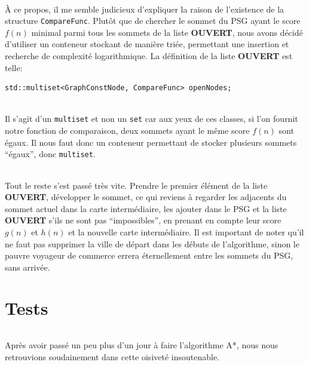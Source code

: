 \documentclass[french]{article}
\begin{document}
\paragraph{} À ce propos, il me semble judicieux d'expliquer la raison de
l'existence de la structure \texttt{CompareFunc}. Plutôt que de chercher le
sommet du PSG ayant le score $f(n)$ minimal parmi tous les sommets de la liste
\textbf{OUVERT}, nous avons décidé d'utiliser un conteneur stockant de manière
triée, permettant une insertion et recherche de complexité logarithmique. La
définition de la liste \textbf{\Large{OUVERT}} est telle:

\begin{verbatim}
std::multiset<GraphConstNode, CompareFunc> openNodes;
\end{verbatim}

\paragraph{} Il s'agit d'un \texttt{multiset} et non un \texttt{set} car aux
yeux de ces classes, si l'on fournit notre fonction de comparaison, deux
sommets ayant le même score $f(n)$ sont égaux. Il nous faut donc un conteneur
permettant de stocker plusieurs sommets ``égaux'', donc \texttt{multiset}.

\paragraph{} Tout le reste s'est passé très vite. Prendre le premier élément de
la liste \textbf{\huge{OUVERT}}, développer le sommet, ce qui reviens à
regarder les adjacents du sommet actuel dans la carte intermédiaire, les
ajouter dans le PSG et la liste \textbf{\Huge{OUVERT}} s'ils ne sont pas
``impossibles'', en prenant en compte leur score $g(n)$ et $h(n)$ et la
nouvelle carte intermédiaire. Il est important de noter qu'il ne faut pas
supprimer la ville de départ dans les débuts de l'algorithme, sinon le pauvre
voyageur de commerce errera éternellement entre les sommets du PSG, sans
arrivée.

\part{Tests}

\paragraph{} Après avoir passé un peu plus d'un jour à faire l'algorithme A*,
nous nous retrouvions soudainement dans cette oisiveté insoutenable.
\end{document}
